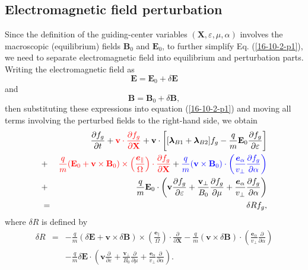 \documentclass{llncs}
\newcommand{\tmcolor}[2]{{\color{#1}{#2}}}
\newcommand{\tmmathbf}[1]{\ensuremath{\boldsymbol{#1}}}
\begin{document}
\subsection{Electromagnetic field perturbation}

Since the definition of the guiding-center variables $(\mathbf{X},
\varepsilon, \mu, \alpha)$ involves the macroscopic (equilibrium) fields
$\mathbf{B}_0$ and $\mathbf{E}_0$, to further simplify Eq. (\ref{16-10-2-p1}),
we need to separate electromagnetic field into equilibrium and perturbation
parts. Writing the electromagnetic field as
\begin{equation}
  \label{16-10-27-1} \mathbf{E}=\mathbf{E}_0 + \delta \mathbf{E}
\end{equation}
and
\begin{equation}
  \label{16-10-27-2} \mathbf{B}=\mathbf{B}_0 + \delta \mathbf{B},
\end{equation}
then substituting these expressions into equation (\ref{16-10-2-p1}) and
moving all terms involving the perturbed fields to the right-hand side, we
obtain
\begin{eqnarray}
  &  & \frac{\partial f_g}{\partial t} + \tmcolor{red}{\mathbf{v} \cdot
  \frac{\partial f_g}{\partial \mathbf{X}}} +\mathbf{v} \cdot \left[
  [\tmmathbf{\lambda}_{B 1} +\tmmathbf{\lambda}_{B 2}] f_g - \frac{q}{m}
  \mathbf{E}_0 \frac{\partial f_g}{\partial \varepsilon} \right] \nonumber\\
  & + & \tmcolor{red}{\frac{q}{m} (\mathbf{E}_0 +\mathbf{v} \times
  \mathbf{B}_0) \times \left( \frac{\tmmathbf{e}_{\parallel}}{\Omega}  \right)
  \cdot \frac{\partial f_g}{\partial \mathbf{X}}} + \tmcolor{blue}{\frac{q}{m}
  (\mathbf{v} \times \mathbf{B}_0) \cdot \left(
  \frac{\tmmathbf{e}_{\alpha}}{v_{\perp}}  \frac{\partial f_g}{\partial
  \alpha} \right)} \nonumber\\
  & + & \frac{q}{m} \mathbf{E}_0 \cdot \left( \mathbf{v} \frac{\partial
  f_g}{\partial \varepsilon} + \frac{\mathbf{v}_{\perp}}{B_0}  \frac{\partial
  f_g}{\partial \mu} + \frac{\tmmathbf{e}_{\alpha}}{v_{\perp}}  \frac{\partial
  f_g}{\partial \alpha} \right) \nonumber\\
  & = & \delta R f_g,  \label{16-10-2-p2}
\end{eqnarray}
where $\delta R$ is defined by
\begin{eqnarray}
  \delta R & = & - \frac{q}{m} (\delta \mathbf{E}+\mathbf{v} \times \delta
  \mathbf{B}) \times \left( \frac{\tmmathbf{e}_{\parallel}}{\Omega}  \right)
  \cdot \frac{\partial}{\partial \mathbf{X}} - \frac{q}{m} (\mathbf{v} \times
  \delta \mathbf{B}) \cdot \left( \frac{\tmmathbf{e}_{\alpha}}{v_{\perp}} 
  \frac{\partial}{\partial \alpha} \right) \nonumber\\
  &  & - \frac{q}{m} \delta \mathbf{E} \cdot \left( \mathbf{v}
  \frac{\partial}{\partial \varepsilon} + \frac{\mathbf{v}_{\perp}}{B_0} 
  \frac{\partial}{\partial \mu} + \frac{\tmmathbf{e}_{\alpha}}{v_{\perp}} 
  \frac{\partial}{\partial \alpha} \right) .  \label{16-10-6-1}
\end{eqnarray}
\end{document}
